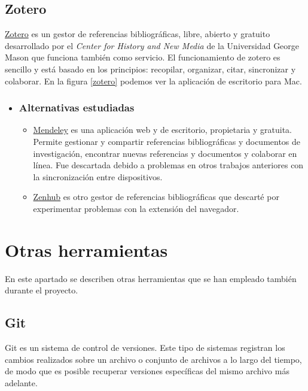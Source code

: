  \subsection{Zotero}\label{docs_zotero}
 \href{https://www.zotero.org/}{Zotero} es un gestor de referencias bibliográficas, libre, abierto y gratuito desarrollado por el \textit{Center for History and New Media} de la Universidad George Mason que funciona también como servicio. El funcionamiento de zotero es sencillo y está basado en los principios: recopilar, organizar, citar, sincronizar y colaborar. En la figura \ref{zotero} podemos ver la aplicación de escritorio para Mac.
  
  
   \begin{itemize}
   	\item \subsubsection{Alternativas estudiadas}
   		\begin{itemize}
	 	\item \href{https://www.mendeley.com/}{Mendeley}  es una aplicación web y de escritorio, propietaria y gratuita. Permite gestionar y compartir referencias bibliográficas y documentos de investigación, encontrar nuevas referencias y documentos y colaborar en línea. Fue descartada debido a problemas en otros trabajos anteriores con la sincronización entre dispositivos.
	   	\item \href{https://www.zenhub.com/}{Zenhub} es otro gestor de referencias bibliográficas que descarté por experimentar problemas con la extensión del navegador.
		\end{itemize}
	\end{itemize}
  
  \section{Otras herramientas}\label{otrasherramientas}
En este apartado se describen otras herramientas que se han empleado también durante el proyecto.

 \subsection{Git}
Git \cite{git_2019} es un sistema de control de versiones. Este tipo de sistemas registran los cambios realizados sobre un archivo o conjunto de archivos a lo largo del tiempo, de modo que es posible recuperar versiones específicas del mismo archivo más adelante.

